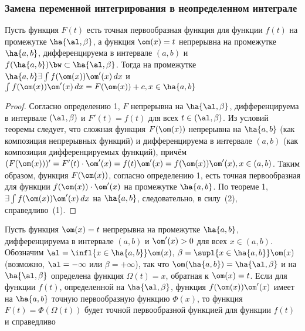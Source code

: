 \documentclass[a4paper]{article}
\begin{document}
\subsubsection{Замена переменной интегрирования в неопределенном интеграле}
\begin{theorem}
Пусть функция $F(t)$ есть точная первообразная функция для функции
$f(t)$ на промежутке $\ha{\al, \beta}$, а функция $\om(x)=t$
непрерывна на промежутке $\ha{a,b}$, дифференцируема в интервале
$(a,b)$ и $f(\ha{a,b}) \bw\subset \ha{\al, \beta}$. Тогда на
промежутке $\ha{a,b} \exists \int f(\om(x)) \om'(x) \,dx$ и
$\int f(\om(x)) \om'(x) \,dx=F(\om(x))+c, x\in \ha{a,b}$
\end{theorem}
\begin{proof}
  Согласно определению 1, $F$ непрерывна на $\ha{\al, \beta}$,
  дифференцируема в интервале $(\al,\beta)$ и $F'(t)=f(t)$ для
  всех $t \in (\al,\beta)$. Из условий теоремы следует, что
  сложная функция $F(\om(x))$ непрерывна на $\ha{a,b}$ (как
  композиция непрерывных функций) и дифференцируема в интервале
  $(a,b)$ (как композиция дифференцируемых функций), причём
  $(F(\om(x)))'=F'(t)\cdot\om'(x)=f(t)\om'(x)=f(\om(x))\om'(x),
  x\in (a,b)$. Таким образом, функция $F(\om(x))$, согласно
  определению 1, есть точная первообразная для функции
  $f(\om(x))\cdot\om'(x)$ на промежутке $\ha{a,b}$. По теореме
  1, $\exists \int f(\om(x))\om'(x)\,dx$ на $\ha{a,b}$,
  следовательно, в силу~(2), справедливо~(1).
\end{proof}
\begin{theorem}
  Пусть функция $\om(x)=t$ непрерывна на промежутке $\ha{a,b}$,
  дифференцируема в интервале $(a,b)$ и $\om'(x)>0$ для всех
  $x\in(a,b)$. Обозначим $\al=\infl{x\in\ha{a,b}} \om(x)$, $\beta=\supl{x\in\ha{a,b}}\om(x)$ (возможно,
  $\al=-\infty$ или $\beta=+\infty$), так что
  $\om(\ha{a,b})=\ha{\al,\beta}$ и на $\ha{\al,\beta}$
  определена функция $\Omega(t)=x$, обратная к $\om(x)=t$. Если
  для функции $f(t)$, определенной на $\ha{\al,\beta}$, функция
  $f(\om(x))\om'(x)$ имеет на $\ha{a,b}$ точную первообразную
  функцию $\Phi(x)$, то функция $F(t)=\Phi(\Omega(t))$ будет точной
  первообразной функцией для функции $f(t)$ и справедливо
\end{theorem}
\end{document}
